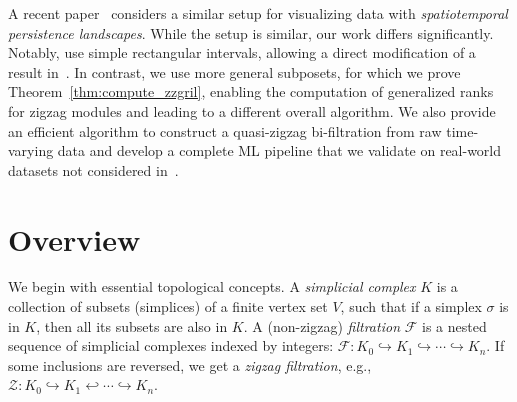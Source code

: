 \documentclass{article}
\theoremstyle{plain}
\theoremstyle{definition}
\theoremstyle{remark}
\begin{document}
A recent paper~\cite{flammer24} considers a similar setup for visualizing data with \emph{spatiotemporal persistence landscapes}. While the setup is similar, our work differs significantly. Notably, \cite{flammer24} use simple rectangular intervals, allowing a direct modification of a result in~\cite{DKM24}. In contrast, we use more general subposets, for which we prove Theorem~\ref{thm:compute_zzgril}, enabling the computation of generalized ranks for zigzag modules and leading to a different overall algorithm. We also provide an efficient algorithm to construct a quasi-zigzag bi-filtration from raw time-varying data and develop a complete ML pipeline that we validate on real-world datasets not considered in~\cite{flammer24}.


\section{Overview}
\label{sec:overview}

We begin with essential topological concepts. A \emph{simplicial complex} $K$ is a collection of subsets (simplices) of a finite vertex set $V$, such that if a simplex $\sigma$ is in $K$, then all its subsets are also in $K$. A (non-zigzag) \emph{filtration} $\mathcal F$ is a nested sequence of simplicial complexes indexed by
integers:
$\mathcal{F}: K_0\hookrightarrow K_1\hookrightarrow\cdots\hookrightarrow K_n$. If some inclusions are reversed, we get a \emph{zigzag filtration}, e.g., $\mathcal{Z}: K_0\hookrightarrow K_1\hookleftarrow \cdots\hookrightarrow K_n$.
\end{document}
